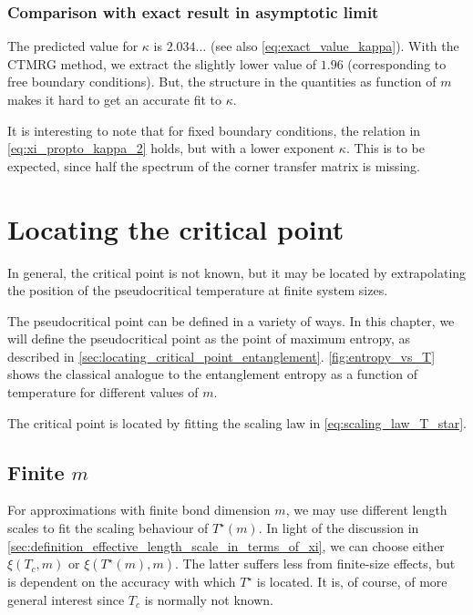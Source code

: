 \subsubsection{Comparison with exact result in asymptotic limit}

The predicted value for $\kappa$ \cite{pollmann2009theory} is $2.034\dots$ (see also \autoref{eq:exact_value_kappa}).
With the CTMRG method, we extract the slightly lower value of $1.96$ (corresponding to free boundary conditions).
But, the structure in the quantities as function of $m$ makes it hard to get an accurate fit to $\kappa$.

It is interesting to note that for fixed boundary conditions, the relation in \autoref{eq:xi_propto_kappa_2} holds,
but with a lower exponent $\kappa$.
This is to be expected, since half the spectrum of the corner transfer matrix is missing.

\section{Locating the critical point}\label{sec:locating_the_critical_point}

In general, the critical point is not known, but it may be located by extrapolating the position of the pseudocritical temperature at finite system sizes.

The pseudocritical point can be defined in a variety of ways.
In this chapter, we will define the pseudocritical point as the point of maximum entropy,
as described in \autoref{sec:locating_critical_point_entanglement}.
\autoref{fig:entropy_vs_T} shows the classical analogue to the entanglement entropy as a function of temperature for
different values of $m$.

The critical point is located by fitting the scaling law in \autoref{eq:scaling_law_T_star}.

\subsection{Finite $m$}
For approximations with finite bond dimension $m$, we may use different length scales to fit the scaling behaviour of
$T^{\star}(m)$.
In light of the discussion in \autoref{sec:definition_effective_length_scale_in_terms_of_xi},
we can choose either $\xi(T_c, m)$ or $\xi(T^{\star}(m), m)$.
The latter suffers less from finite-size effects, but is dependent on the accuracy with which $T^{\star}$ is located.
It is, of course, of more general interest since $T_c$ is normally not known.

